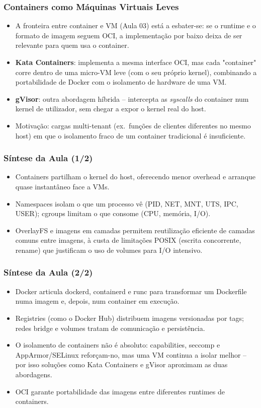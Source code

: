 \documentclass[aspectratio=169]{beamer}
\begin{document}
\begin{frame}
\frametitle{Containers como Máquinas Virtuais Leves}
\begin{itemize}
    \setlength\itemsep{0.4cm}
    \item A fronteira entre container e VM (Aula 03) está a esbater-se: se o runtime e o formato de imagem seguem OCI, a implementação por baixo deixa de ser relevante para quem usa o container.
    \item \textbf{Kata Containers}: implementa a mesma interface OCI, mas cada "container" corre dentro de uma micro-VM leve (com o seu próprio kernel), combinando a portabilidade de Docker com o isolamento de hardware de uma VM.
    \item \textbf{gVisor}: outra abordagem híbrida -- intercepta as \textit{syscalls} do container num kernel de utilizador, sem chegar a expor o kernel real do host.
    \item Motivação: cargas multi-tenant (ex.\ funções de clientes diferentes no mesmo host) em que o isolamento fraco de um container tradicional é insuficiente.
\end{itemize}
\end{frame}

\begin{frame}
\frametitle{Síntese da Aula \textcolor{NudeTaupe}{\small(1/2)}}
\begin{itemize}
    \setlength\itemsep{0.4cm}
    \item Containers partilham o kernel do host, oferecendo menor overhead e arranque quase instantâneo face a VMs.
    \item Namespaces isolam o que um processo vê (PID, NET, MNT, UTS, IPC, USER); cgroups limitam o que consome (CPU, memória, I/O).
    \item OverlayFS e imagens em camadas permitem reutilização eficiente de camadas comuns entre imagens, à custa de limitações POSIX (escrita concorrente, rename) que justificam o uso de volumes para I/O intensivo.
\end{itemize}
\end{frame}

\begin{frame}
\frametitle{Síntese da Aula \textcolor{NudeTaupe}{\small(2/2)}}
\begin{itemize}
    \setlength\itemsep{0.4cm}
    \item Docker articula dockerd, containerd e runc para transformar um Dockerfile numa imagem e, depois, num container em execução.
    \item Registries (como o Docker Hub) distribuem imagens versionadas por tags; redes bridge e volumes tratam de comunicação e persistência.
    \item O isolamento de containers não é absoluto: capabilities, seccomp e AppArmor/SELinux reforçam-no, mas uma VM continua a isolar melhor -- por isso soluções como Kata Containers e gVisor aproximam as duas abordagens.
    \item OCI garante portabilidade das imagens entre diferentes runtimes de containers.
\end{itemize}
\end{frame}
\end{document}
